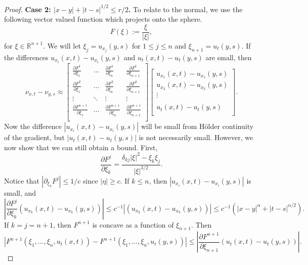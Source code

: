 \documentclass{amsart}
\numberwithin{equation}{section}
\begin{document}
\begin{proof}
   \noindent \textbf{Case 2: $|x-y|+|t-s|^{1/2}\leq r/2$.}
       To relate to the normal, we use the following vector valued function which projects onto the sphere. 
    \[
    F(\xi):= \frac{\xi}{|\xi|},
    \]
    for $\xi \in \mathbb{R}^{n+1}$. We will let $\xi_j =u_{x_j}(y,s)$ for $1\leq j \leq n$ and $\xi_{n+1}=u_t(y,s)$. If the differences $u_{x_i}(x,t)-u_{x_i}(y,s)$ and $u_t(x,t)-u_t(y,s)$ are small, then
    \[
     \nu_{x,t}-\nu_{y,s}\approx
     \begin{bmatrix}
         \frac{\partial F^1}{\partial \xi_1} & \dots &\frac{\partial F^1}{\partial \xi_n}
         & \frac{\partial F^1}{\partial \xi_{n+1}} \\
         \frac{\partial F^2}{\partial \xi_1} & \dots &\frac{\partial F^2}{\partial \xi_n}
         & \frac{\partial F^2}{\partial \xi_{n+1}} \\
          \vdots &\ddots &\vdots & \vdots\\
         \frac{\partial F^{n+1}}{\partial \xi_1} & \dots &\frac{\partial F^{n+1}}{\partial \xi_n}
         & \frac{\partial F^{n+1}}{\partial \xi_{n+1}} \\
     \end{bmatrix}
     \begin{bmatrix}
         u_{x_1}(x,t)-u_{x_1}(y,s) \\
         u_{x_2}(x,t)-u_{x_2}(y,s) \\
         \vdots \\
         \\
         u_{t}(x,t)-u_{t}(y,s) \\
     \end{bmatrix}.
    \]
    Now the difference $|u_{x_i}(x,t)-u_{x_i}(y,s)|$ will be small from H\"older continuity of the gradient, but $|u_t(x,t)-u_t(y,s)|$ is not necessarily small. However, we now show that we can still obtain a bound. First, 
    \[
    \frac{\partial F^j}{\partial \xi_k} = \frac{\delta_{kj}|\xi|^2 - \xi_k \xi_j}{|\xi|^{3/2}}. 
    \]
    Notice that $|\partial_{\xi_k} F^j|\leq 1/c$ since $|\eta| \geq c$. If $k \leq n$, then 
    $|u_{x_i}(x,t)-u_{x_i}(y,s)|$ is small, and 
    \[
     \left|\frac{\partial F^j}{\partial \xi_k} (u_{x_k}(x,t) -u_{x_k}(y,s))\right|
     \leq c^{-1}|(u_{x_k}(x,t) -u_{x_k}(y,s))| \leq c^{-1}(|x-y|^{\alpha} + |t-s|^{\alpha/2}). 
    \]
    If $k=j=n+1$, then $F^{n+1}$ is concave as a function of $\xi_{n+1}$. Then 
    \[
    |F^{n+1}(\xi_1,\ldots,\xi_n,u_t(x,t))- F^{n+1}(\xi_1,\ldots,\xi_n,u_t(y,s))|
    \leq \left|\frac{\partial F^{n+1}}{\partial \xi_{n+1}} (u_{t}(x,t) -u_{t}(y,s))\right|.
\]
\end{proof}
\end{document}
